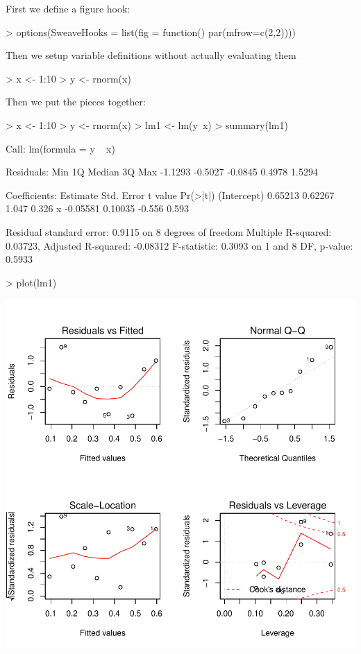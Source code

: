 \documentclass[a4paper]{article}
\begin{document}



First we define a figure hook:
\begin{Schunk}
\begin{Sinput}
> options(SweaveHooks = list(fig = function() par(mfrow=c(2,2))))
\end{Sinput}
\end{Schunk}

Then we setup variable definitions without actually evaluating them
\begin{Schunk}
\begin{Sinput}
> x <- 1:10
> y <- rnorm(x)
\end{Sinput}
\end{Schunk}


Then we put the pieces together:
\begin{center}
\begin{Schunk}
\begin{Sinput}
> x <- 1:10
> y <- rnorm(x)
> lm1 <- lm(y~x)
> summary(lm1)
\end{Sinput}
\begin{Soutput}
Call:
lm(formula = y ~ x)

Residuals:
    Min      1Q  Median      3Q     Max 
-1.1293 -0.5027 -0.0845  0.4978  1.5294 

Coefficients:
            Estimate Std. Error t value Pr(>|t|)
(Intercept)  0.65213    0.62267   1.047    0.326
x           -0.05581    0.10035  -0.556    0.593

Residual standard error: 0.9115 on 8 degrees of freedom
Multiple R-squared: 0.03723,	Adjusted R-squared: -0.08312 
F-statistic: 0.3093 on 1 and 8 DF,  p-value: 0.5933 
\end{Soutput}
\begin{Sinput}
> plot(lm1)
\end{Sinput}
\end{Schunk}
\includegraphics{example2-003}
\end{center}
\end{document}
